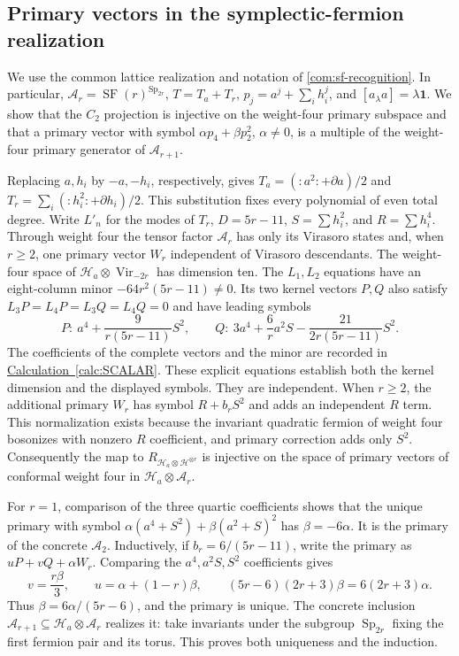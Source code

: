 \documentclass[11pt,a4paper]{amsart}
\numberwithin{equation}{section}
\theoremstyle{definition}
\theoremstyle{remark}
\newcommand{\SF}{\operatorname{SF}}
\newcommand{\Sp}{\operatorname{Sp}}
\newcommand{\Vir}{\operatorname{Vir}}
\begin{document}
\subsection{Primary vectors in the symplectic-fermion realization}
\label{app:primary-four}
We use the common lattice realization and notation of
\cref{com:sf-recognition}. In particular,
$\mathcal A_r=\SF(r)^{\Sp_{2r}}$, $T=T_a+T_r$,
$p_j=a^j+\sum_i h_i^j$, and $[a_\lambda a]=\lambda\mathbf1$.
We show that the $C_2$ projection is injective on the weight-four
primary subspace and that a primary vector with symbol
$\alpha p_4+\beta p_2^2$, $\alpha\ne0$, is a multiple of the
weight-four primary generator of $\mathcal A_{r+1}$.

Replacing $a,h_i$ by $-a,-h_i$, respectively, gives
$T_a=(:a^2:+\partial a)/2$ and
$T_r=\sum_i(:h_i^2:+\partial h_i)/2$.
This substitution fixes every polynomial of even total degree. Write $L'_n$ for the modes of
$T_r$, $D=5r-11$, $S=\sum h_i^2$, and $R=\sum h_i^4$.
Through weight four the tensor factor $\mathcal A_r$ has only its Virasoro
states and, when $r\ge2$, one primary vector $W_r$ independent of Virasoro descendants.
The weight-four space of $\mathcal H_a\otimes\Vir_{-2r}$ has
dimension ten. The $L_1,L_2$ equations have an eight-column minor
$-64r^2(5r-11)\ne0$. Its two kernel vectors $P,Q$ also satisfy
$L_3P=L_4P=L_3Q=L_4Q=0$ and have leading symbols
$$
 P:\ a^4+\frac9{r(5r-11)}S^2,\qquad
 Q:\ 3a^4+\frac6r a^2S-\frac{21}{2r(5r-11)}S^2.
$$
The coefficients of the complete vectors and the minor are recorded in
\hyperref[calc:SCALAR]{Calculation~\ref*{calc:SCALAR}}. These explicit equations establish
both the kernel dimension and the displayed symbols.
They are independent. When $r\ge2$, the additional primary $W_r$ has
symbol $R+b_rS^2$ and adds an independent $R$ term. This normalization exists because the invariant quadratic fermion of weight four bosonizes with
nonzero $R$ coefficient, and primary correction adds only $S^2$.
Consequently the map to $R_{\mathcal H_a\otimes\mathcal H^{\otimes r}}$
is injective on the space of primary vectors of conformal weight four
in $\mathcal H_a\otimes \mathcal A_r$.

For $r=1$, comparison of the three quartic coefficients shows that the
unique primary with symbol $\alpha(a^4+S^2)+\beta(a^2+S)^2$ has
$\beta=-6\alpha$. It is the primary of the concrete $\mathcal A_2$.
Inductively, if $b_r=6/(5r-11)$, write the primary as
$uP+vQ+\alpha W_r$. Comparing the $a^4,a^2S,S^2$ coefficients gives
$$
 v=\frac{r\beta}{3},\qquad u=\alpha+(1-r)\beta,
 \qquad (5r-6)(2r+3)\beta=6(2r+3)\alpha.
$$
Thus $\beta=6\alpha/(5r-6)$, and the primary is unique. The concrete
inclusion $\mathcal A_{r+1}\subseteq\mathcal H_a\otimes \mathcal A_r$ realizes it:
take invariants under the subgroup $\Sp_{2r}$ fixing the first fermion
pair and its torus. This proves both uniqueness and the induction.
\end{document}

